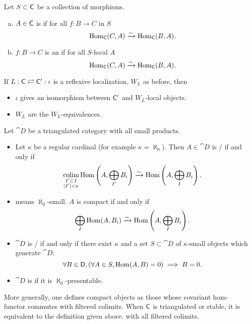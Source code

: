 \begin{definition}
Let $S\subset \mathsf{C}$ be a collection of morphisms.
\begin{enumerate}[a)]
\item $A\in \mathsf{C}$ is  if for all $f:B\to C$ in $S$
\[
\operatorname{Hom}_\mathsf{C}(C,A) \xrightarrow{\sim} \operatorname{Hom}_\mathsf{C}(B,A).
\]
\item $f:B\to C$ is an  if for all $S$-local $A$
\[
\operatorname{Hom}_{\mathsf{C}}(C,A) \xrightarrow{\sim} \operatorname{Hom}_\mathsf{C}(B,A).
\]
\end{enumerate}
\end{definition}
\begin{lemma}
If $L:\mathsf{C} \rightleftarrows \mathsf{C}':\iota$ is a reflexive localization, $W_L$ as before, then
\begin{itemize}
\item $\iota$ gives an isomorphism between $\mathsf{C}'$ and $W_L$-local objects.
\item $W_L$ are the $W_L$-equivalences.
\end{itemize}
\end{lemma}
\begin{definition}
Let $\cat{D}$ be a triangulated category with all small products.
\begin{itemize}
\item Let $\kappa$ be a regular cardinal (for example $\kappa=\aleph_0$). Then $A\in
\cat{D}$ is / if and only if
\[
\operatorname*{colim}_{\substack{I' \subset I \\ |I'|<\kappa}} \operatorname{Hom}\left( A,\bigoplus_{I'}B_i \right)
\xrightarrow{\sim} \operatorname{Hom}\left( A, \bigoplus_I B_i \right)
.\]
\item {} means $\aleph_0$-small. $A$ is compact if and only if
\[
\bigoplus_I \operatorname{Hom}(A,B_i) \xrightarrow{\sim} \operatorname{Hom} \left( A,\bigoplus_{I}B_i \right)
.\]
\item $\cat{D}$ is / if and only if there exist
$\kappa$ and a set $S\subset \cat{D}$ of $\kappa$-small objects which generate $\cat{D}$:
\[
\forall B\in \mathsf{D},\left( \forall A\in S, \operatorname{Hom}(A,B)=0 \right) \implies B = 0
.\]
\item $\cat{D}$ is  if it is $\aleph_0$-presentable.
\end{itemize}
More generally, one defines compact objects as those whose covariant
hom-functor commutes with filtered colimits. When $\mathsf{C}$ is triangulated or
stable, it is equivalent to the definition given above.
with all filtered colimits.
\end{definition}

